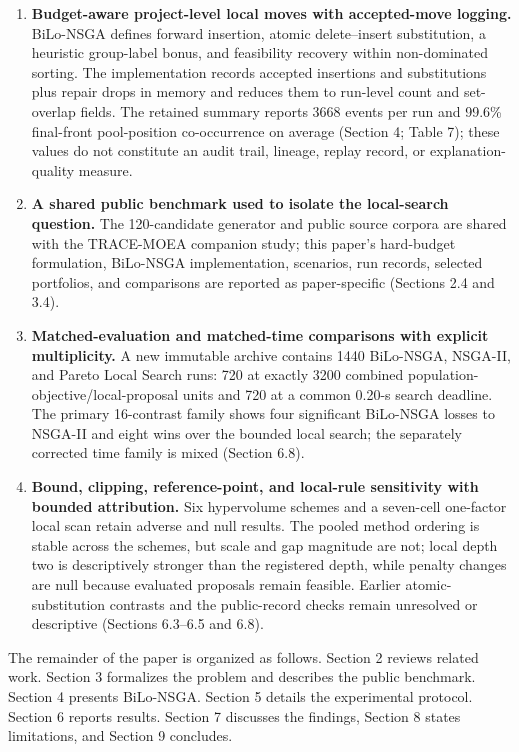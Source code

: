 \documentclass[
]{article}
\providecommand{\tightlist}{%
  \setlength{\itemsep}{0pt}\setlength{\parskip}{0pt}}
\begin{document}
\begin{enumerate}
\def\labelenumi{\arabic{enumi}.}
\tightlist
\item
  \textbf{Budget-aware project-level local moves with accepted-move logging.} BiLo-NSGA defines forward insertion, atomic delete--insert substitution, a heuristic group-label bonus, and feasibility recovery within non-dominated sorting. The implementation records accepted insertions and substitutions plus repair drops in memory and reduces them to run-level count and set-overlap fields. The retained summary reports 3668 events per run and 99.6\% final-front pool-position co-occurrence on average (Section 4; Table 7); these values do not constitute an audit trail, lineage, replay record, or explanation-quality measure.
\item
  \textbf{A shared public benchmark used to isolate the local-search question.} The 120-candidate generator and public source corpora are shared with the TRACE-MOEA companion study; this paper's hard-budget formulation, BiLo-NSGA implementation, scenarios, run records, selected portfolios, and comparisons are reported as paper-specific (Sections 2.4 and 3.4).
\item
  \textbf{Matched-evaluation and matched-time comparisons with explicit multiplicity.} A new immutable archive contains 1440 BiLo-NSGA, NSGA-II, and Pareto Local Search runs: 720 at exactly 3200 combined population-objective/local-proposal units and 720 at a common 0.20-s search deadline. The primary 16-contrast family shows four significant BiLo-NSGA losses to NSGA-II and eight wins over the bounded local search; the separately corrected time family is mixed (Section 6.8).
\item
  \textbf{Bound, clipping, reference-point, and local-rule sensitivity with bounded attribution.} Six hypervolume schemes and a seven-cell one-factor local scan retain adverse and null results. The pooled method ordering is stable across the schemes, but scale and gap magnitude are not; local depth two is descriptively stronger than the registered depth, while penalty changes are null because evaluated proposals remain feasible. Earlier atomic-substitution contrasts and the public-record checks remain unresolved or descriptive (Sections 6.3--6.5 and 6.8).
\end{enumerate}

The remainder of the paper is organized as follows. Section 2 reviews related work. Section 3 formalizes the problem and describes the public benchmark. Section 4 presents BiLo-NSGA. Section 5 details the experimental protocol. Section 6 reports results. Section 7 discusses the findings, Section 8 states limitations, and Section 9 concludes.
\end{document}
